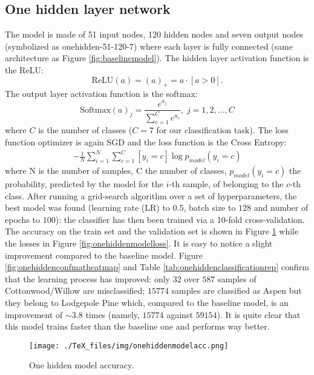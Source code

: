 \subsection{One hidden layer network}
\label{sec:onehidden}
The model is made of 51 input nodes, 120 hidden nodes and seven output nodes (symbolized as onehidden-51-120-7) where each layer is fully connected (same architecture as Figure \ref{fig:baselinemodel}). The hidden layer activation function is the ReLU:
\begin{equation}
\text{ReLU}(a) = (a)_+ = a\cdot[a>0].
\end{equation}
The output layer activation function is the softmax:
\begin{equation}
\text{Softmax}(a)_j = \frac{e^{a_j}}{\sum_{c=1}^{C} e^{a_c}}, \; j = 1,2,\dots,C 
\end{equation}
where $C$ is the number of classes ($C=7$ for our classification task). The loss function optimizer is again SGD and the loss function is the Cross Entropy:
\begin{equation}
\begin{aligned}
- \frac{1}{N} \sum_{i=1}^{N}\sum_{c=1}^{C} [y_i = c] \log p_{model}(y_i = c)
\end{aligned}
\end{equation}
where N is the number of samples, C the number of classes, $p_{model}(y_i = c)$ the probability, predicted by the model for the $i$-th sample, of belonging to the $c$-th class. After running a grid-search algorithm over a set of hyperparameters, the best model was found (learning rate (LR) to $0.5$, batch size to $128$ and number of epochs to $100$): the classifier has then been trained via a 10-fold cross-validation. The accuracy on the train set and the validation set is shown in Figure \ref{fig:onehiddenmodelacc} while the losses in Figure \ref{fig:onehiddenmodelloss}. It is easy to notice a slight improvement compared to the baseline model. Figure \ref{fig:onehiddenconfmatheatmap} and Table \ref{tab:onehiddenclassificationrep} confirm that the learning process has improved: only $32$ over $587$ samples of Cottonwood/Willow are misclassified; $15774$ samples are classified as Aspen but they belong to Lodgepole Pine which, compared to the baseline model, is an improvement of $\sim3.8$ times (namely, $15774$ against $59154$).
It is quite clear that this model trains faster than the baseline one and performs way better.
\begin{figure}
\centering
\texttt{[image: ./TeX\_files/img/onehiddenmodelacc.png]}
\caption{One hidden model accuracy.}
\label{fig:onehiddenmodelacc}
\end{figure}
